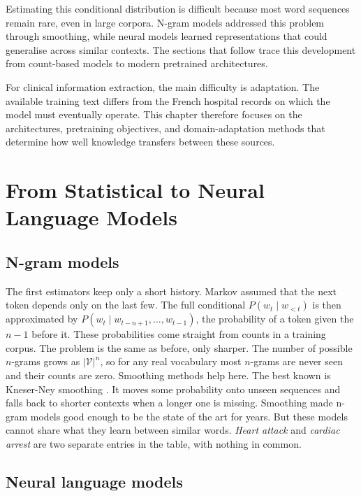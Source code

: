 Estimating this conditional distribution is difficult because most word
sequences remain rare, even in large corpora. N-gram models addressed this
problem through smoothing, while neural models learned representations that
could generalise across similar contexts. The sections that follow trace this
development from count-based models to modern pretrained architectures.

For clinical information extraction, the main difficulty is adaptation. The
available training text differs from the French hospital records on which the
model must eventually operate. This chapter therefore focuses on the
architectures, pretraining objectives, and domain-adaptation methods that
determine how well knowledge transfers between these sources.


\section{From Statistical to Neural Language Models}
\label{sec:lm-stat-neural}

\subsection{N-gram models}

The first estimators keep only a short history. Markov assumed that the next
token depends only on the last few. The full conditional $P(w_t \mid w_{<t})$ is
then approximated by $P(w_t \mid w_{t-n+1}, \ldots, w_{t-1})$, the probability of a token
given the $n-1$ before it. These probabilities come straight from counts in a
training corpus. The problem is the same as before, only sharper. The number of
possible $n$-grams grows as $|\mathcal{V}|^{n}$, so for any real vocabulary most
$n$-grams are never seen and their counts are zero. Smoothing methods help here.
The best known is Kneser-Ney smoothing \citep{kneserney1995}. It moves some probability
onto unseen sequences and falls back to shorter contexts when a longer one is
missing. Smoothing made n-gram models good enough to be the state of the art for years.
But these models cannot share what they learn between similar words. \emph{Heart attack}
and \emph{cardiac arrest} are two separate entries in the table, with nothing in
common.

\subsection{Neural language models}


